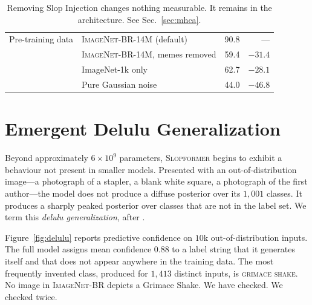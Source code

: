 \documentclass[10pt]{article}
\newcommand{\slop}{\textsc{Slopformer}}
\newcommand{\br}{\textsc{ImageNet-BR}}
\begin{document}
\begin{table}[t]
\begin{tabular}{llrr}
\midrule
Pre-training data & \br{}-14M (default)    & 90.8 & --- \\
                  & \br{}-14M, memes removed & 59.4 & $\mathbf{-31.4}$ \\
                  & ImageNet-1k only       & 62.7 & $-28.1$ \\
                  & Pure Gaussian noise    & 44.0 & $-46.8$ \\
\bottomrule
\end{tabular}
\vspace{0.2em}
\caption*{\small Removing Slop Injection changes nothing measurable. It remains
in the architecture. See Sec.~\ref{sec:mhca}.}
\end{table}

\section{Emergent Delulu Generalization}
\label{sec:delulu}

Beyond approximately $6\times10^{9}$ parameters, \slop{} begins to exhibit a
behaviour not present in smaller models. Presented with an out-of-distribution
image---a photograph of a stapler, a blank white square, a photograph of the
first author---the model does not produce a diffuse posterior over its $1{,}001$
classes. It produces a sharply peaked posterior over classes that are not in the
label set. We term this \emph{delulu generalization}, after
\citet{delulu2024solulu}.

Figure~\ref{fig:delulu} reports predictive confidence on $10$k out-of-distribution
inputs. The full model assigns mean confidence $0.88$ to a label string that it
generates itself and that does not appear anywhere in the training data. The
most frequently invented class, produced for $1{,}413$ distinct inputs, is
\textsc{grimace shake}. No image in \br{} depicts a Grimace Shake. We have
checked. We checked twice.
\end{document}
